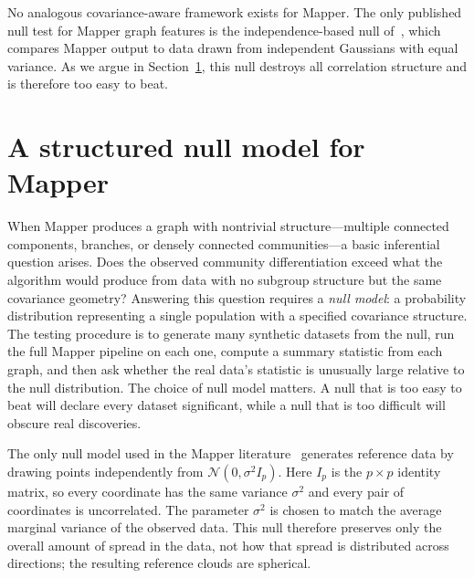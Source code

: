\documentclass[hidelinks]{siamart251216}
\begin{document}
No analogous covariance-aware framework exists for Mapper.  The only
published null test for Mapper graph features is the
independence-based null of~\cite{Lum2013}, which compares Mapper output
to data drawn from independent Gaussians with equal variance.  As we
argue in Section~\ref{sec:null}, this null destroys all correlation
structure and is therefore too easy to beat.




\section{A structured null model for Mapper}\label{sec:null}

When Mapper produces a graph with nontrivial structure---multiple
connected components, branches, or densely connected
communities---a basic inferential question arises.  Does the observed
community differentiation exceed what the algorithm would produce from
data with no subgroup structure but the same covariance geometry?
Answering this question requires a \emph{null model}: a probability
distribution representing a single population with a specified
covariance structure.  The testing procedure is to generate many synthetic
datasets from the null, run the full Mapper pipeline on each one,
compute a summary statistic from each graph, and then ask whether the
real data's statistic is unusually large relative to the null
distribution.  The choice of null model matters.  A null that is too
easy to beat will declare every dataset significant, while a null that
is too difficult will obscure real discoveries.

The only null model used in the Mapper
literature~\citep{Lum2013} generates reference data by drawing points
independently from $\mathcal{N}(0, \sigma^2 I_p)$.  Here $I_p$ is the
$p \times p$ identity matrix, so every coordinate has the same variance
$\sigma^2$ and every pair of coordinates is uncorrelated.  The parameter
$\sigma^2$ is chosen to match the average marginal variance of the
observed data.  This null therefore preserves only the overall amount of
spread in the data, not how that spread is distributed across
directions; the resulting reference clouds are spherical.
\end{document}
